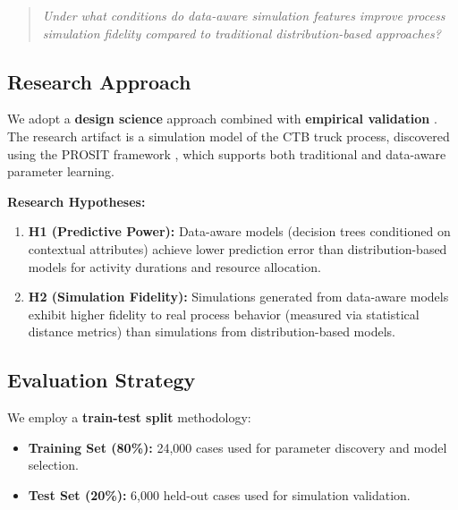 \begin{quote}
\textit{Under what conditions do data-aware simulation features improve process simulation fidelity compared to traditional distribution-based approaches?}
\end{quote}

    \subsection{Research Approach}
    
    We adopt a \textbf{design science} approach combined with \textbf{empirical validation} \cite{Hevner2004}. The research artifact is a simulation model of the CTB truck process, discovered using the PROSIT framework \cite{Vinci2026prosit}, which supports both traditional and data-aware parameter learning.
    
    \textbf{Research Hypotheses:}
    
    \begin{enumerate}
        \item \textbf{H1 (Predictive Power):} Data-aware models (decision trees conditioned on contextual attributes) achieve lower prediction error than distribution-based models for activity durations and resource allocation.
        
        \item \textbf{H2 (Simulation Fidelity):} Simulations generated from data-aware models exhibit higher fidelity to real process behavior (measured via statistical distance metrics) than simulations from distribution-based models.
    \end{enumerate}
    
    \subsection{Evaluation Strategy}
    
    We employ a \textbf{train-test split} methodology:
    
    \begin{itemize}
        \item \textbf{Training Set (80\%):} 24,000 cases used for parameter discovery and model selection.
        \item \textbf{Test Set (20\%):} 6,000 held-out cases used for simulation validation.
    \end{itemize}



